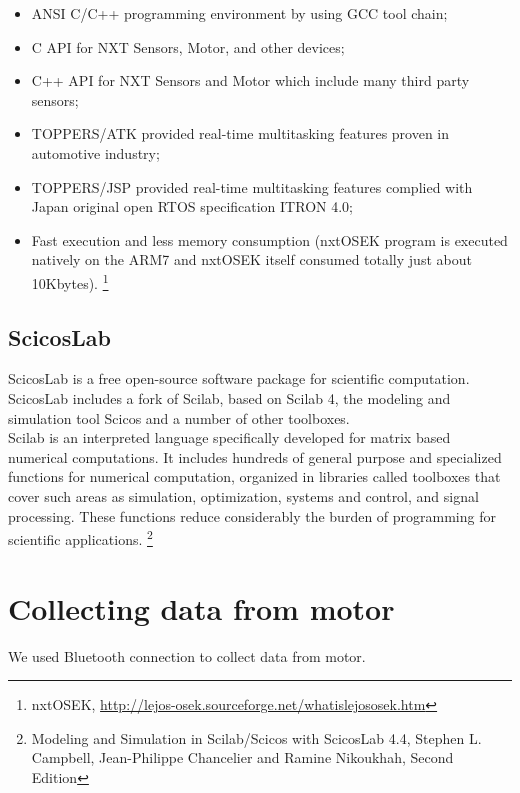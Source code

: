 \documentclass[a4paper,12pt,oneside]{article}
\begin{document}
\begin{itemize}
\item ANSI C/C++ programming environment by using GCC tool chain;
\item C API for NXT Sensors, Motor, and other devices;
\item C++ API for NXT Sensors and Motor which include many third party sensors;
\item TOPPERS/ATK provided real-time multitasking features proven in automotive industry;
\item TOPPERS/JSP provided real-time multitasking features complied with Japan original open RTOS specification ITRON 4.0;
\item Fast execution and less memory consumption (nxtOSEK program is executed natively on the ARM7 and nxtOSEK itself consumed totally just about 10Kbytes).
\footnote{nxtOSEK, \url{http://lejos-osek.sourceforge.net/whatislejososek.htm}}
\end{itemize}

\subsection{ScicosLab}
ScicosLab is a free open-source software package for scientific computation. ScicosLab includes a fork of Scilab, based on Scilab 4, the modeling and simulation tool Scicos and a number of other toolboxes.
\\
Scilab is an interpreted language specifically developed for matrix based numerical computations. It includes hundreds of general purpose and specialized functions for numerical computation, organized in libraries called toolboxes that cover such areas as simulation, optimization, systems and control, and signal processing. These functions reduce considerably the burden of programming for scientific applications. \footnote{Modeling and Simulation in Scilab/Scicos with ScicosLab 4.4, Stephen L. Campbell, Jean-Philippe Chancelier and Ramine Nikoukhah, Second Edition}


\section{Collecting data from motor}
We used Bluetooth connection to collect data from motor.
\end{document}
